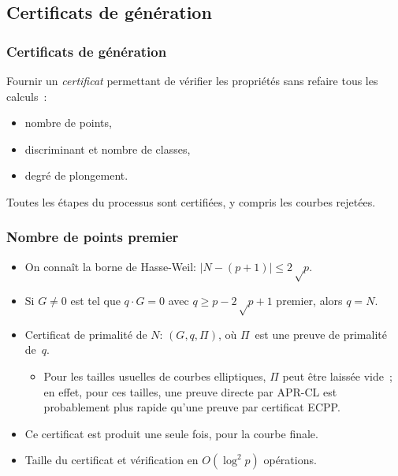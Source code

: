 \documentclass[francais]{beamer}
\newcommand{\abs}[1]{\left| #1 \right|}
\begin{document}
\subsection{Certificats de génération}

\begin{frame}\frametitle{Certificats de génération}

Fournir un \emph{certificat} permettant
de vérifier les propriétés sans refaire tous les calculs :
\begin{itemize}
\item nombre de points,
\item discriminant et nombre de classes,
\item degré de plongement.
\end{itemize}
Toutes les étapes du processus sont certifiées,
y compris les courbes rejetées.
\end{frame}

\begin{frame}\frametitle{Nombre de points premier}
\begin{itemize}
\item On connaît la borne de Hasse-Weil: $\abs{N-(p+1)} ≤ 2√p$.
\medskip
\item Si $G ≠ 0$ est tel que $q · G = 0$ avec $q ≥ p-2√p+1$ premier,
alors $q = N$.
\medskip
\item Certificat de primalité de $N$: $(G, q, Π)$,
où $Π$~est une preuve de primalité de~$q$.
\begin{itemize}
\item Pour les tailles usuelles de courbes elliptiques,
$Π$ peut être laissée vide ;
en effet, pour ces tailles, une preuve directe par APR-CL
est probablement plus rapide qu'une preuve par certificat ECPP.
\end{itemize}
\medskip
\item Ce certificat est produit une seule fois, pour la courbe finale.
\item Taille du certificat et vérification en $O(\log^2 p)$ opérations.
\end{itemize}
\end{frame}
\end{document}
